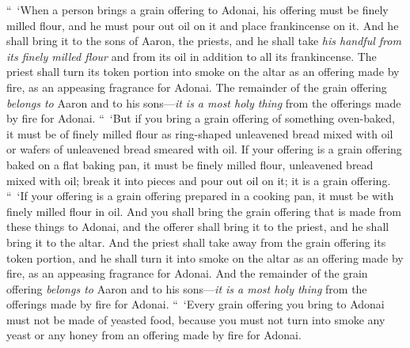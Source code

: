 \begin{biblechapter} %
 “ ‘When a person brings a grain offering to Adonai, his offering must be finely milled flour, and he must pour out oil on it and place frankincense on it.
\verse And he shall bring it to the sons of Aaron, the priests, and he shall take \textit{his handful from its finely milled flour} and from its oil in addition to all its frankincense. The priest shall turn its token portion into smoke on the altar as an offering made by fire, as an appeasing fragrance for Adonai.
\verse The remainder of the grain offering \textit{belongs to} Aaron and to his sons—\textit{it is a most holy thing} from the offerings made by fire for Adonai.
\verse “ ‘But if you bring a grain offering of something oven-baked, it must be of finely milled flour as ring-shaped unleavened bread mixed with oil or wafers of unleavened bread smeared with oil.
\verse If your offering is a grain offering baked on a flat baking pan, it must be finely milled flour, unleavened bread mixed with oil;
\verse break it into pieces and pour out oil on it; it is a grain offering.
\verse “ ‘If your offering is a grain offering prepared in a cooking pan, it must be with finely milled flour in oil.
\verse And you shall bring the grain offering that is made from these things to Adonai, and the offerer shall bring it to the priest, and he shall bring it to the altar.
\verse And the priest shall take away from the grain offering its token portion, and he shall turn it into smoke on the altar as an offering made by fire, as an appeasing fragrance for Adonai.
\verse And the remainder of the grain offering \textit{belongs to} Aaron and to his sons—\textit{it is a most holy thing} from the offerings made by fire for Adonai.
\verse “ ‘Every grain offering you bring to Adonai must not be made of yeasted food, because you must not turn into smoke any yeast or any honey from an offering made by fire for Adonai.

\end{biblechapter}
